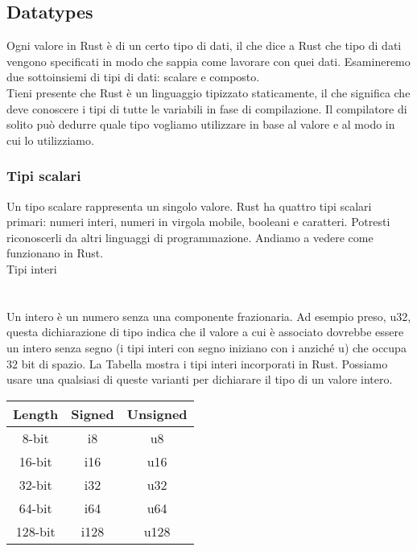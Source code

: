 \documentclass[11pt,a4paper]{article}
\begin{document}
\subsection{Datatypes}

Ogni valore in Rust è di un certo tipo di dati, il che dice a Rust che tipo di dati vengono specificati in modo che sappia come lavorare con quei dati. Esamineremo due sottoinsiemi di tipi di dati: scalare e composto.\\
Tieni presente che Rust è un linguaggio tipizzato staticamente, il che significa che deve conoscere i tipi di tutte le variabili in fase di compilazione. Il compilatore di solito può dedurre quale tipo vogliamo utilizzare in base al valore e al modo in cui lo utilizziamo.\\

\subsubsection{Tipi scalari}

Un tipo scalare rappresenta un singolo valore. Rust ha quattro tipi scalari primari: numeri interi, numeri in virgola mobile, booleani e caratteri. Potresti riconoscerli da altri linguaggi di programmazione. Andiamo a vedere come funzionano in Rust.\\

Tipi interi\\
\\
\\
Un intero è un numero senza una componente frazionaria. Ad esempio preso, u32, questa dichiarazione di tipo indica che il valore a cui è associato dovrebbe essere un intero senza segno (i tipi interi con segno iniziano con i anziché u) che occupa 32 bit di spazio. La Tabella mostra i tipi interi incorporati in Rust. Possiamo usare una qualsiasi di queste varianti per dichiarare il tipo di un valore intero.

\begin{table}[H]
\centering
\begin{tabular}{ccc}
\hline
\rowcolor[HTML]{C0C0C0} 
Length                        & Signed                    & Unsigned                  \\ \hline
\multicolumn{1}{|c|}{8-bit}   & \multicolumn{1}{c|}{i8}   & \multicolumn{1}{c|}{u8}   \\ \hline
\multicolumn{1}{|c|}{16-bit}  & \multicolumn{1}{c|}{i16}  & \multicolumn{1}{c|}{u16}  \\ \hline
\multicolumn{1}{|c|}{32-bit}  & \multicolumn{1}{c|}{i32}  & \multicolumn{1}{c|}{u32}  \\ \hline
\multicolumn{1}{|c|}{64-bit}  & \multicolumn{1}{c|}{i64}  & \multicolumn{1}{c|}{u64}  \\ \hline
\multicolumn{1}{|c|}{128-bit} & \multicolumn{1}{c|}{i128} & \multicolumn{1}{c|}{u128} \\ \hline
\end{tabular}
\end{table}
\end{document}
